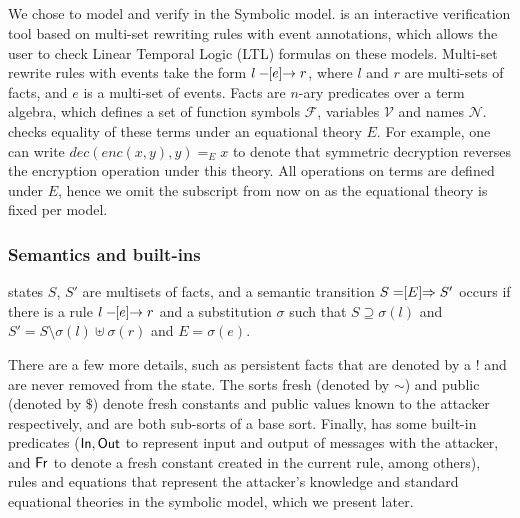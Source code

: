 \spacehack
\subsection{\mTamarin{}}
\label{sec:tamarin}
\fillhack
We chose \mTamarin{} to model and verify \mEdhoc{} in the Symbolic model.
%
\mTamarin{} is an interactive verification tool based on multi-set rewriting rules
with event annotations, which allows the user to check Linear Temporal Logic
(LTL) formulas on these models.
%
Multi-set rewrite rules with events take the form $ l \ifarrow[e] r $,
where $l$ and $r$ are multi-sets of facts, and $e$ is a multi-set of events.
Facts are $n$-ary predicates over a term algebra, which defines a set of function
symbols $\mathcal F$, variables $\mathcal V$ and names $\mathcal N$. \mTamarin{}
checks equality of these terms under an equational theory $E$. For example,
one can write $ dec(enc(x,y),y) =_E x $
to denote that symmetric decryption reverses the encryption operation under this theory.
All operations on terms are defined under $E$, hence we omit the
subscript from now on as the equational theory is fixed per model.

\spacehack
\subsubsection{Semantics and built-ins} \phantom{} \mTamarin{} states
$S$, $S'$ are multisets of facts, and a semantic transition $S \semarrow[E] S'$
occurs if there is a rule $l \ifarrow[e] r$ and a substitution $\sigma$ such
that $S \supseteq \sigma(l)$ and $S' = S \setminus \sigma(l) \uplus \sigma(r)$
and $E = \sigma(e)$.

There are a few more details, such as persistent facts that are denoted by a $!$
and are never removed from the state.
%
The sorts fresh (denoted by $\sim$) and public (denoted by $\$$) denote fresh
constants and public values known to the attacker respectively, and are both
sub-sorts of a base sort.
%
Finally, \mTamarin{} has some built-in predicates ($\mathsf{In},
\mathsf{Out}$ to represent input and output of messages with the attacker,
and
$\mathsf{Fr}$ to denote a fresh constant created in the current rule, among
others), rules and equations that represent the attacker's knowledge
and standard equational theories in the symbolic model,
which we present later.

